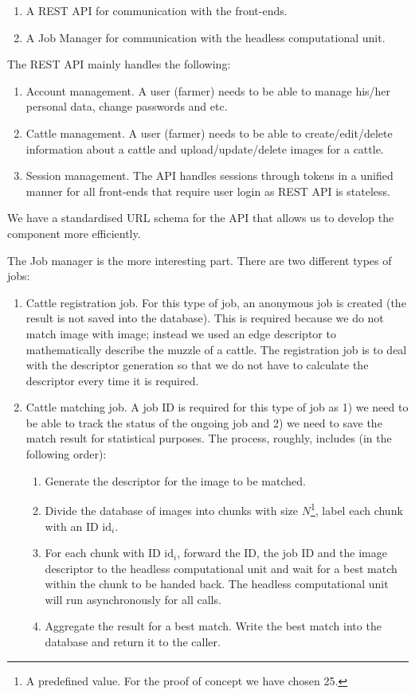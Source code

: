 \begin{enumerate}
	\item A REST API for communication with the front-ends.
	\item A Job Manager for communication with the headless computational unit.
\end{enumerate}

The REST API mainly handles the following:

\begin{enumerate}
	\item Account management. A user (farmer) needs to be able to manage his/her personal data, change passwords and etc.
	\item Cattle management. A user (farmer) needs to be able to create/edit/delete information about a cattle and upload/update/delete images for a cattle. 
	\item Session management. The API handles sessions through tokens in a unified manner for all front-ends that require user login as REST API is stateless.
\end{enumerate}

We have a standardised URL schema for the API that allows us to develop the component more efficiently.

The Job manager is the more interesting part. There are two different types of jobs:

\begin{enumerate}
	\item Cattle registration job. For this type of job, an anonymous job is created (the result is not saved into the database). This is required because we do not match image with image; instead we used an edge descriptor to mathematically describe the muzzle of a cattle. The registration job is to deal with the descriptor generation so that we do not have to calculate the descriptor every time it is required.
	\item Cattle matching job. A job ID is required for this type of job as 1) we need to be able to track the status of the ongoing job and 2) we need to save the match result for statistical purposes. The process, roughly, includes (in the following order):
	\begin{enumerate}
		\item Generate the descriptor for the image to be matched.
		\item Divide the database of images into chunks with size $N$\footnote{A predefined value. For the proof of concept we have chosen 25.}, label each chunk with an ID $\text{id}_i$.
		\item For each chunk with ID $\text{id}_i$, forward the ID, the job ID and the image descriptor to the headless computational unit and wait for a best match within the chunk to be handed back. The headless computational unit will run asynchronously for all calls.
		\item Aggregate the result for a best match. Write the best match into the database and return it to the caller.
	\end{enumerate}
\end{enumerate}

